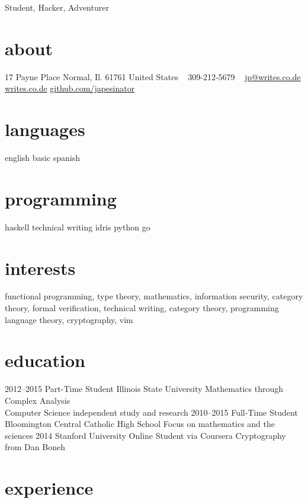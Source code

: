 \documentclass[]{friggeri-cv}
\begin{document}
       {Student, Hacker, Adventurer}


\begin{aside}
  \section{about}
    17 Payne Place
    Normal, Il. 61761
    United States
    ~
    309-212-5679
    ~
    \href{mailto:jp@writes.co.de}{jp@writes.co.de}
    \href{http://writes.co.de}{writes.co.de}
    \href{http://github.com/japesinator}{github.com/japesinator}
  \section{languages}
    english
    basic spanish
  \section{programming}
    haskell
    technical writing
    idris
    python
    go
\end{aside}

\section{interests}

functional programming, type theory, mathematics, information security,
category theory, formal verification, technical writing, category theory,
programming language theory, cryptography, vim

\section{education}

\begin{entrylist}
  \entry
    {2012–2015}
    {Part-Time Student}
    {Illinois State University}
    {Mathematics through Complex Analysis\\
    Computer Science independent study and research}
  \entry
    {2010–2015}
    {Full-Time Student}
    {Bloomington Central Catholic High School}
    {Focus on mathematics and the sciences}
  \entry
    {2014}
    {Stanford University}
    {Online Student via Coursera}
    {Cryptography from Dan Boneh}
\end{entrylist}

\section{experience}
\end{document}
